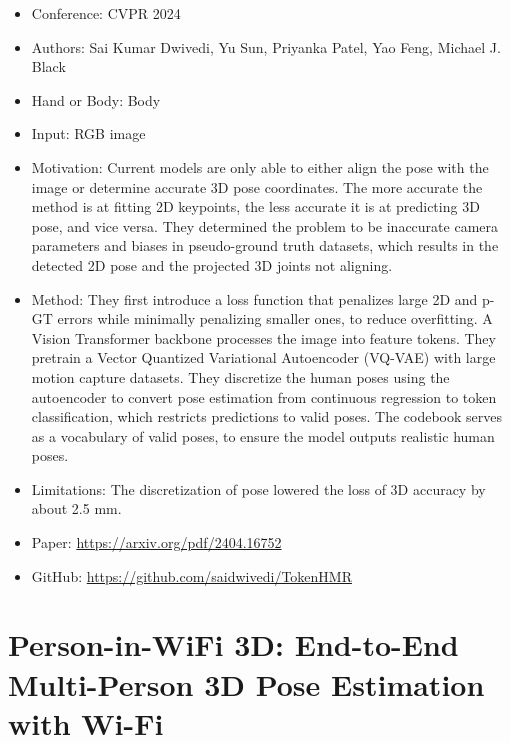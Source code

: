 \documentclass{article}
\begin{document}
\begin{itemize}
    \item Conference: CVPR 2024
    \item Authors: Sai Kumar Dwivedi, Yu Sun, Priyanka Patel, Yao Feng, Michael J. Black
    \item Hand or Body: Body
    \item Input: RGB image
    \item Motivation: Current models are only able to either align the pose with the image or determine accurate 3D pose coordinates. The more accurate the method is at fitting 2D keypoints, the less accurate it is at predicting 3D pose, and vice versa. They determined the problem to be inaccurate camera parameters and biases in pseudo-ground truth datasets, which results in the detected 2D pose and the projected 3D joints not aligning.
    \item Method: They first introduce a loss function that penalizes large 2D and p-GT errors while minimally penalizing smaller ones, to reduce overfitting. A Vision Transformer backbone processes the image into feature tokens. They pretrain a Vector Quantized Variational Autoencoder (VQ-VAE) with large motion capture datasets. They discretize the human poses using the autoencoder to convert pose estimation from continuous regression to token classification, which restricts predictions to valid poses. The codebook serves as a vocabulary of valid poses, to ensure the model outputs realistic human poses.
    \item Limitations: The discretization of pose lowered the loss of 3D accuracy by about 2.5 mm.
    \item Paper: \url{https://arxiv.org/pdf/2404.16752}
    \item GitHub: \url{https://github.com/saidwivedi/TokenHMR}
\end{itemize}

\section*{Person-in-WiFi 3D\@: End-to-End Multi-Person 3D Pose Estimation with Wi-Fi}
\end{document}
